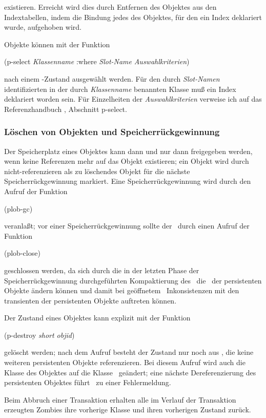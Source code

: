 existieren. Erreicht wird dies durch Entfernen des Objektes aus den
Indextabellen, indem die Bindung jedes \Slt[s]\/ des Objektes, f\"{u}r den
ein Index deklariert wurde, aufgehoben wird.
%
\par{}Objekte k\"{o}nnen mit der Funktion
%
\begin{listing}[\tt]%
(p-select {\rm\it\lt{}Klassenname\gt\/}
          :where {\rm\it\lt{}Slot-Name\gt\/}
          {\rm\it\lt{}Auswahlkriterien\gt\/})
\end{listing}%
%
\noindent nach einem \Slt\/-Zustand ausgew\"{a}hlt werden. F\"{u}r den durch
{\rm\it\lt{}Slot-Namen\gt\/} identifizierten \Slt\/ in der durch
{\rm\it\lt{}Klassenname\gt\/} benannten Klasse mu\ss{} ein Index
deklariert worden sein. F\"{u}r Einzelheiten der
{\rm\it\lt{}Auswahlkriterien\gt\/} verweise ich auf das
Referenzhandbuch \cite{bib:ki94b}, Abschnitt \rglq{}p-select\rgrq.
%
\subsubsection{L\"{o}schen von Objekten und Speicherr\"{u}ckgewinnung}
%
Der Speicherplatz eines Objektes kann dann und nur dann freigegeben
werden, wenn keine Referenzen mehr auf das Objekt existieren; ein
Objekt wird durch nicht-referenzieren als zu l\"{o}\-schen\-des Objekt
f\"{u}r die n\"{a}chste Speicherr\"{u}ckgewinnung \rglq{}markiert\rgrq{}.
Eine Speicherr\"{u}ckgewinnung wird durch den Aufruf der Funktion
%
\begin{listing}[\tt]%
(plob-gc)
\end{listing}%
%
\noindent veranla\ss{}t; vor einer Speicherr\"{u}ckgewinnung sollte der
\postore\ durch einen Aufruf der Funktion
%
\begin{listing}[\tt]%
(plob-close)
\end{listing}%
%
\noindent geschlossen werden, da sich durch die in der letzten Phase
der Speicherr\"{u}ckgewinnung durchgef\"{u}hrten Kompaktierung des
\postore\ die \objid[s]\ der persistenten Objekte \"{a}ndern k\"{o}nnen und
damit bei ge\"{o}ffnetem \postore\ Inkonsistenzen mit den transienten
\representations{} der persistenten Objekte auftreten k\"{o}nnen.
%
\par{}Der Zustand eines Objektes kann explizit mit der Funktion
%
\begin{listing}[\tt]%
(p-destroy {\rm\it\lt{}short objid\gt\/})
\end{listing}%
%
\noindent gel\"{o}scht werden; nach dem Aufruf besteht der Zustand nur
noch aus \immval[s], die keine weiteren persistenten Objekte
referenzieren. Bei diesem Aufruf wird auch die Klasse des Objektes auf
die Klasse \ ge\"{a}ndert; eine n\"{a}chste Dereferenzierung
des persistenten Objektes f\"{u}hrt \ia\ zu einer Fehlermeldung.
%
\par{}Beim Abbruch einer Transaktion erhalten alle im Verlauf der
Transaktion erzeugten Zombies ihre vorherige Klasse und ihren
vorherigen Zustand zur\"{u}ck.
%
